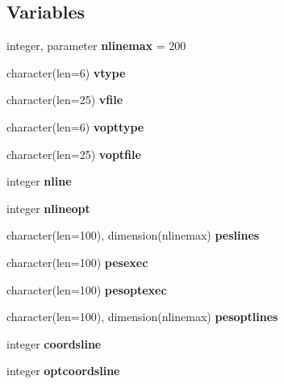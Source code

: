 \subsection*{Variables}
\begin{DoxyCompactItemize}
\item 
\mbox{\label{namespacepes_ab1edb0ccbc2eb292e13a56f8490d53fd}} 
integer, parameter {\bfseries nlinemax} = 200
\item 
\mbox{\label{namespacepes_a23a59fcac6a8142f8487d45cfeffe13c}} 
character(len=6) {\bfseries vtype}
\item 
\mbox{\label{namespacepes_a643f44e7ca705ba0662ef672cebff6e6}} 
character(len=25) {\bfseries vfile}
\item 
\mbox{\label{namespacepes_aba41be36b42b1eb05bffcb6871ac6ed8}} 
character(len=6) {\bfseries vopttype}
\item 
\mbox{\label{namespacepes_a72029e7281dce1ebc94575b13602eeab}} 
character(len=25) {\bfseries voptfile}
\item 
\mbox{\label{namespacepes_ae49ab5998f0aed64f710ab11951c213c}} 
integer {\bfseries nline}
\item 
\mbox{\label{namespacepes_ae313c93e32635bc18dce3687e1f27eba}} 
integer {\bfseries nlineopt}
\item 
\mbox{\label{namespacepes_a356c2c5f579447fc6cfec92bf4bcab4f}} 
character(len=100), dimension(nlinemax) {\bfseries peslines}
\item 
\mbox{\label{namespacepes_af916a63154659413614f19bba60f5350}} 
character(len=100) {\bfseries pesexec}
\item 
\mbox{\label{namespacepes_a3130c949413ee53f32a3a93fa84859d7}} 
character(len=100) {\bfseries pesoptexec}
\item 
\mbox{\label{namespacepes_aaab517e0695444b997ba8545228504a3}} 
character(len=100), dimension(nlinemax) {\bfseries pesoptlines}
\item 
\mbox{\label{namespacepes_a0169d7fd9e9ff2db13217335d745195e}} 
integer {\bfseries coordsline}
\item 
\mbox{\label{namespacepes_a71cc0573350a31abe52ccf496ded3513}} 
integer {\bfseries optcoordsline}
\end{DoxyCompactItemize}


